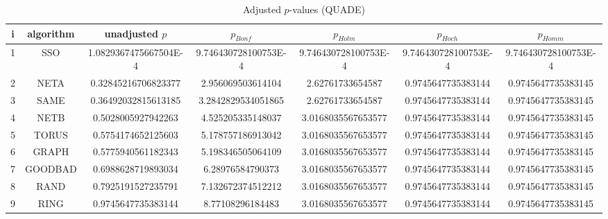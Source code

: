 \documentclass[a4paper,10pt]{article}
\begin{document}
\begin{landscape}
\begin{table}[!htp]
\centering\scriptsize
\caption{Adjusted $p$-values (QUADE)}
\begin{tabular}{ccccccc}
i&algorithm&unadjusted $p$&$p_{Bonf}$&$p_{Holm}$&$p_{Hoch}$&$p_{Homm}$\\
\hline
1& SSO&1.0829367475667504E-4&9.746430728100753E-4&9.746430728100753E-4&9.746430728100753E-4&9.746430728100753E-4\\
2& NETA&0.32845216706823377&2.956069503614104&2.62761733654587&0.9745647735383144&0.9745647735383145\\
3& SAME&0.36492032815613185&3.2842829534051865&2.62761733654587&0.9745647735383144&0.9745647735383145\\
4& NETB&0.5028005927942263&4.525205335148037&3.0168035567653577&0.9745647735383144&0.9745647735383145\\
5& TORUS&0.5754174652125603&5.178757186913042&3.0168035567653577&0.9745647735383144&0.9745647735383145\\
6& GRAPH&0.5775940561182343&5.198346505064109&3.0168035567653577&0.9745647735383144&0.9745647735383145\\
7& GOODBAD&0.6988628719893034&6.28976584790373&3.0168035567653577&0.9745647735383144&0.9745647735383145\\
8& RAND&0.7925191527235791&7.132672374512212&3.0168035567653577&0.9745647735383144&0.9745647735383145\\
9& RING&0.9745647735383144&8.77108296184483&3.0168035567653577&0.9745647735383144&0.9745647735383145\\
\hline
\end{tabular}
\end{table}


\end{landscape}
\end{document}
